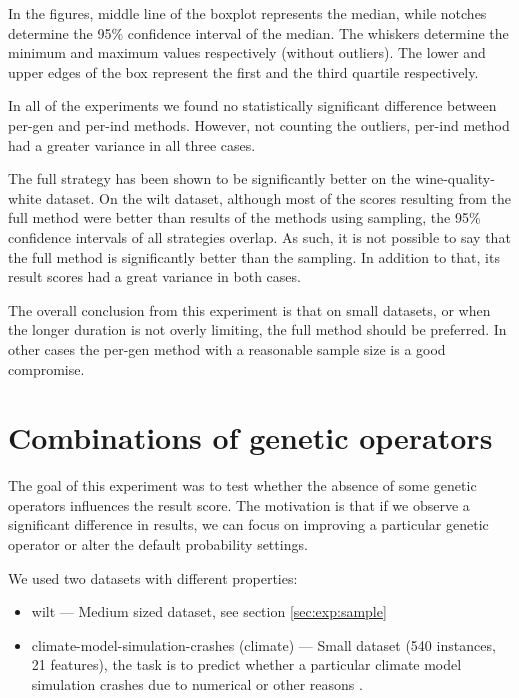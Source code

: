 In the figures, middle line of the boxplot represents the median, while notches determine the
95\% confidence interval of the median. The whiskers determine the minimum and
maximum values respectively (without outliers). The lower and upper edges of
the box represent the first and the third quartile respectively.

In all of the experiments we found no statistically significant difference
between per-gen and per-ind methods. However, not counting
the outliers, per-ind method had a greater variance in all three cases.

The full strategy has been shown to be significantly better on the
wine-quality-white dataset. On the wilt dataset, although most of the scores
resulting from the full method were better than results of the methods
using sampling, the 95\% confidence intervals of all strategies overlap. As
such, it is not possible to say that the full method is significantly
better than the sampling. In addition to that, its result scores had a great
variance in both cases.

The overall conclusion from this experiment is that on small datasets, or when the
longer duration is not overly limiting, the full
method should be preferred. In other cases the per-gen method with a reasonable
sample size is a good compromise.


\section{Combinations of genetic operators} \label{sec:exp:genop}
The goal of this experiment was to test whether the absence of some genetic
operators influences the result score. The motivation is that if we observe a
significant difference in results, we can focus on improving a particular
genetic operator or alter the default probability settings.

We used two datasets with different properties:
\begin{itemize}
\item wilt --- Medium sized dataset, see section \ref{sec:exp:sample}
\item climate-model-simulation-crashes (climate) --- Small dataset (540
instances, 21 features), the task is to predict whether a particular
climate model simulation crashes due to numerical or other reasons
\citep{gmd-6-1157-2013}.
\end{itemize}

